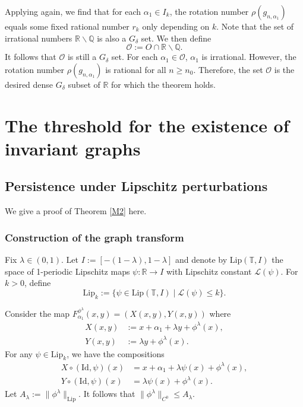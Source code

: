 \documentclass{amsart}
\newcommand{\R}{\mathbb{R}}
\newcommand{\Lip}{\mathrm{Lip}}
\newcommand{\la}{\lambda}
\newcommand{\al}{\alpha}
\newcommand{\T}{\mathbb{T}}
\theoremstyle{definition}
\begin{document}
Applying \cite[Lemma 4.2]{de} again, we find that for each $\alpha_1 \in I_k$, the rotation number $\rho(g_{n,\alpha_1})$ equals some fixed rational number $r_k$ only depending on $k$. Note that the set of irrational numbers $\R\backslash\mathbb{Q}$ is also a $G_\delta$ set. We then define
\[\mathcal{O} := O\cap\R\backslash\mathbb{Q}.\]
It follows that $\mathcal{O}$ is still a $G_\delta$ set. For each $\al_1\in \mathcal{O}$, $\al_1$ is irrational. However,  the rotation number $\rho(g_{n,\alpha_1})$ is rational for all $n\geq n_0$. Therefore, the set $\mathcal{O}$ is the desired dense $G_\delta$ subset of $\R$ for which the theorem holds.






 \vspace{2em}

	\section{\sc The threshold for the existence of invariant graphs}\label{S4}
	

\subsection{Persistence under Lipschitz perturbations}
We give a proof of Theorem \ref{M2} here.
\subsubsection{Construction of the graph transform}
Fix $\la\in (0,1)$. Let $I := [-(1-\lambda), 1-\lambda]$ and denote by $\Lip(\T, I)$ the space of 1-periodic Lipschitz maps $\psi: \R \to I$ with Lipschitz constant $\mathcal{L}(\psi)$. For $k > 0$, define
\[
\Lip_k := \{\psi \in \Lip(\T, I) \mid \mathcal{L}(\psi) \leq k\}.
\]

Consider the map $F_{\al_1}^{\phi^\lambda}(x,y) = (X(x,y), Y(x,y))$ where
\begin{align*}
X(x,y) &:= x + \alpha_1 + \lambda y + \phi^\lambda(x), \\
Y(x,y) &:= \lambda y + \phi^\lambda(x).
\end{align*}
For any $\psi \in \Lip_k$, we have the compositions
\begin{align*}
X \circ (\mathrm{Id}, \psi)(x) &= x + \alpha_1 + \lambda \psi(x) + \phi^\lambda(x), \\
Y \circ (\mathrm{Id}, \psi)(x) &= \lambda \psi(x) + \phi^\lambda(x).
\end{align*}
Let $A_\lambda := \|\phi^\lambda\|_{\mathrm{Lip}}$. It follows that $\|\phi^\la\|_{C^0}\leq A_\lambda$.
\end{document}

